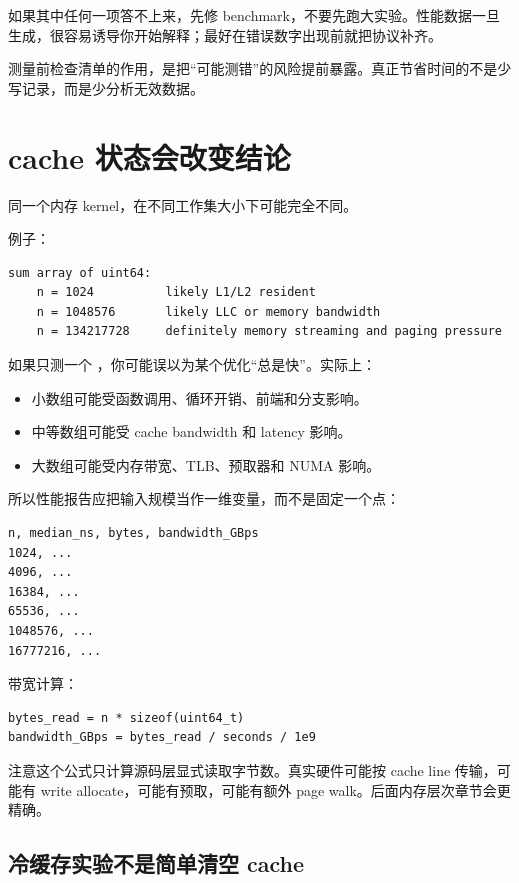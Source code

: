 如果其中任何一项答不上来，先修 benchmark，不要先跑大实验。性能数据一旦生成，很容易诱导你开始解释；最好在错误数字出现前就把协议补齐。

\begin{keyidea}
测量前检查清单的作用，是把“可能测错”的风险提前暴露。真正节省时间的不是少写记录，而是少分析无效数据。
\end{keyidea}

\section{cache 状态会改变结论}

同一个内存 kernel，在不同工作集大小下可能完全不同。

例子：

\begin{lstlisting}
sum array of uint64:
    n = 1024          likely L1/L2 resident
    n = 1048576       likely LLC or memory bandwidth
    n = 134217728     definitely memory streaming and paging pressure
\end{lstlisting}

如果只测一个 ，你可能误以为某个优化“总是快”。实际上：

\begin{itemize}
  \item 小数组可能受函数调用、循环开销、前端和分支影响。
  \item 中等数组可能受 cache bandwidth 和 latency 影响。
  \item 大数组可能受内存带宽、TLB、预取器和 NUMA 影响。
\end{itemize}

所以性能报告应把输入规模当作一维变量，而不是固定一个点：

\begin{lstlisting}
n, median_ns, bytes, bandwidth_GBps
1024, ...
4096, ...
16384, ...
65536, ...
1048576, ...
16777216, ...
\end{lstlisting}

带宽计算：

\begin{lstlisting}
bytes_read = n * sizeof(uint64_t)
bandwidth_GBps = bytes_read / seconds / 1e9
\end{lstlisting}

注意这个公式只计算源码层显式读取字节数。真实硬件可能按 cache line 传输，可能有 write allocate，可能有预取，可能有额外 page walk。后面内存层次章节会更精确。

\subsection{冷缓存实验不是简单清空 cache}

